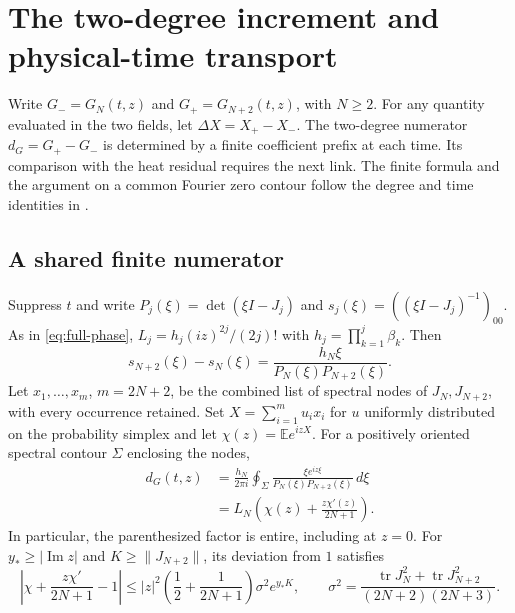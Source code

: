 \section{The two-degree increment and physical-time transport}
\label{sec:degree}

Write \(G_-=G_N(t,z)\) and \(G_+=G_{N+2}(t,z)\), with \(N\ge2\). For any
quantity evaluated in the two fields, let \(\Delta X=X_+-X_-\).
The two-degree numerator \(d_G=G_+-G_-\) is determined by a finite
coefficient prefix at each time. Its comparison with the heat residual
requires the next link. The finite formula and the argument on a common
Fourier zero contour follow the degree and time identities in \cite{jh03}.

\subsection{A shared finite numerator}

\begin{theorem}
\label{d:finite-numerator}
Suppress \(t\) and write \(P_j(\xi)=\det(\xi I-J_j)\) and
\(s_j(\xi)=((\xi I-J_j)^{-1})_{00}\). As in
\eqref{eq:full-phase}, \(L_j=h_j(iz)^{2j}/(2j)!\) with
\(h_j=\prod_{k=1}^j\beta_k\).
Then
\begin{equation}
 s_{N+2}(\xi)-s_N(\xi)=
       \frac{h_N\xi}{P_N(\xi)P_{N+2}(\xi)}.
 \label{d:resolvent}
\end{equation}
Let \(x_1,\ldots,x_m\), \(m=2N+2\), be the combined list of spectral
nodes of \(J_N,J_{N+2}\), with every occurrence retained. Set
\(X=\sum_{i=1}^m u_i x_i\) for \(u\) uniformly distributed on the
probability simplex and let \(\chi(z)=\mathbb E e^{izX}\).
For a positively oriented spectral contour \(\Sigma\) enclosing the nodes,
\begin{align}
 d_G(t,z)
 &=\frac{h_N}{2\pi i}\oint_\Sigma
           \frac{\xi e^{iz\xi}}{P_N(\xi)P_{N+2}(\xi)}\,d\xi
 \label{d:contour-numerator}\\
 &=L_N\left(\chi(z)+\frac{z\chi'(z)}{2N+1}\right).
 \label{d:simplex-numerator}
\end{align}
In particular, the parenthesized factor is entire, including at
\(z=0\). For \(y_*\ge|\operatorname{Im}z|\) and
\(K\ge\|J_{N+2}\|\), its deviation from \(1\) satisfies
\begin{equation}
 \left|\chi+\frac{z\chi'}{2N+1}-1\right|
 \le |z|^2\left(\frac12+\frac1{2N+1}\right)
     \sigma^2 e^{y_*K},
 \qquad
 \sigma^2=
 \frac{\operatorname{tr}J_N^2+\operatorname{tr}J_{N+2}^2}
      {(2N+2)(2N+3)} .
 \label{d:simplex-bound}
\end{equation}
\end{theorem}

